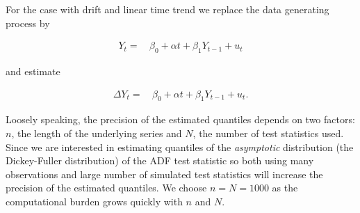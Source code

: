 \documentclass[]{book}
\theoremstyle{definition}
\theoremstyle{definition}
\theoremstyle{definition}
\theoremstyle{remark}
\begin{document}
For the case with drift and linear time trend we replace the data
generating process by

\begin{align*}
  Y_t =& \, \beta_0 + \alpha t + \beta_1 Y_{t-1} + u_t
\end{align*}

and estimate

\begin{align*}
  \Delta Y_t =& \, \beta_0 + \alpha t + \beta_1 Y_{t-1} + u_t.
\end{align*}

Loosely speaking, the precision of the estimated quantiles depends on
two factors: \(n\), the length of the underlying series and \(N\), the
number of test statistics used. Since we are interested in estimating
quantiles of the \emph{asymptotic} distribution (the Dickey-Fuller
distribution) of the ADF test statistic so both using many observations
and large number of simulated test statistics will increase the
precision of the estimated quantiles. We choose \(n=N=1000\) as the
computational burden grows quickly with \(n\) and \(N\).
\end{document}
